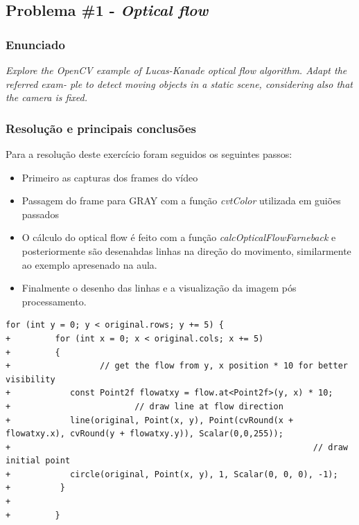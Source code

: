 \documentclass[portuguese, times, mirror]{revdetua}
\begin{document}
\subsection{Problema \#1 - \textit{Optical flow}}

\subsubsection{Enunciado}
\textit{Explore the OpenCV example of Lucas-Kanade optical flow algorithm. Adapt the referred exam-
ple to detect moving objects in a static scene, considering also that the camera is fixed.}


\subsubsection{Resolução e principais conclusões}

Para a resolução deste exercício foram seguidos os seguintes passos: 

\begin{itemize}
    \item Primeiro as capturas dos frames do vídeo
    \item Passagem do frame para GRAY com a função \textit{cvtColor} utilizada em guiões passados
    \item O cálculo do optical flow é feito com a função \textit{calcOpticalFlowFarneback} e posteriormente são desenahdas linhas na direção do movimento, similarmente ao exemplo apresenado na aula.
    \item Finalmente o desenho das linhas e a visualização da imagem pós processamento.
\end{itemize}

\begin{lstlisting}[caption=Excerto do código de processamento,label=code:C]
for (int y = 0; y < original.rows; y += 5) {
+         for (int x = 0; x < original.cols; x += 5)
+         {
+                  // get the flow from y, x position * 10 for better visibility
+            const Point2f flowatxy = flow.at<Point2f>(y, x) * 10;
+                         // draw line at flow direction
+            line(original, Point(x, y), Point(cvRound(x + flowatxy.x), cvRound(y + flowatxy.y)), Scalar(0,0,255));
+                                                             // draw initial point
+            circle(original, Point(x, y), 1, Scalar(0, 0, 0), -1);
+          }
+
+         }
\end{lstlisting}
\end{document}

